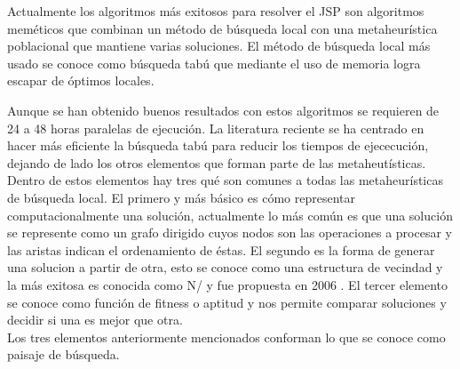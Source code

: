 Actualmente los algoritmos más exitosos para resolver el JSP son algoritmos meméticos que combinan un método de búsqueda local con una metaheurística poblacional que mantiene varias soluciones. El método de búsqueda local más usado se conoce como búsqueda tabú que mediante el uso de memoria logra escapar de óptimos locales.

Aunque se han obtenido buenos resultados con estos algoritmos se requieren de 24 a 48 horas paralelas de ejecución. La literatura reciente se ha centrado en hacer más eficiente la búsqueda tabú para reducir los tiempos de ejececución, dejando de lado los otros elementos que forman parte de las metaheutísticas. Dentro de estos elementos hay tres qué son comunes a todas las metaheurísticas de búsqueda local. El primero y más básico es cómo representar computacionalmente una solución, actualmente lo más común es que una solución se represente como un grafo dirigido cuyos nodos son las operaciones a procesar y las aristas indican el ordenamiento de éstas. El segundo es la forma de generar una solucion a partir de otra, esto se conoce como una estructura de vecindad y la más exitosa es conocida como N/ y fue propuesta en 2006 \cite{Zhang2007}. El tercer elemento se conoce como función de fitness o aptitud y nos permite comparar soluciones y decidir si una es mejor que otra.\\

Los tres elementos anteriormente mencionados conforman lo que se conoce como paisaje de búsqueda.
